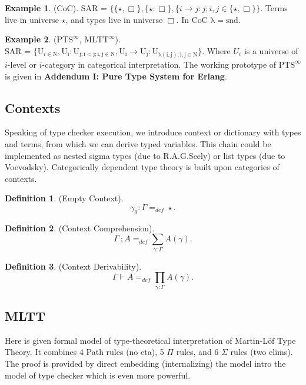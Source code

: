 \documentclass{article}
\theoremstyle{definition}
\newtheorem{definition}{Definition}
\newtheorem{example}{Example}
\begin{document}
\begin{example} (CoC). SAR = $\{ \{\star , \Box \},\{ \star : \Box \},
        \{ i \rightarrow j : j; i, j \in \{ \star, \Box \}
        \}$. Terms live in universe $\star$, and types live in universe $\Box$. In CoC $\mathrm{\lambda=snd}$.
\end{example}

\begin{example} ($\mathrm{PTS}^\infty$, $\mathrm{MLTT}^\infty$).\\ SAR = $\{ \mathrm{U}_{i \in \mathrm{N}},
    \mathrm{U_i : U_{j; i < j; i,j \in N}},
    \mathrm{U_i} \rightarrow \mathrm{U_j} : \mathrm{U_{\lambda(i,j); i,j \in \mathrm{N}}}
    \}$. Where $U_i$ is a universe of $i$-level or $i$-category in categorical interpretation.
    The working prototype of $\mathrm{PTS}^\infty$ is given in
    {\bf Addendum I: Pure Type System for Erlang}\cite{Tonpa18}.
\end{example}

\subsection{Contexts}

Speaking of type checker execution, we introduce context or dictionary with types and terms,
from which we can derive typed variables. This chain could be implemented as
nested sigma types (due to R.A.G.Seely) or list types (due to Voevodsky). Categorically
dependent type theory is built upon categories of contexts.

\begin{definition} (Empty Context).
$$
    \gamma_0 : \Gamma =_{def} \star.
$$
\end{definition}

\begin{definition} (Context Comprehension).
$$
\Gamma\ ; A =_{def} \sum_{\gamma:\Gamma}A(\gamma).
$$
\end{definition}

\begin{definition} (Context Derivability).
$$
\Gamma \vdash A =_{def} \prod_{\gamma:\Gamma}A(\gamma).
$$
\end{definition}

\subsection{MLTT}

Here is given formal model of type-theoretical interpretation of Martin-Löf Type Theory.
It combines 4 Path rules (no eta), 5 $\Pi$ rules, and 6 $\Sigma$ rules (two elims).
The proof is provided by direct embedding (internalizing) the model intro the model
of type checker which is even more powerful.
\end{document}

